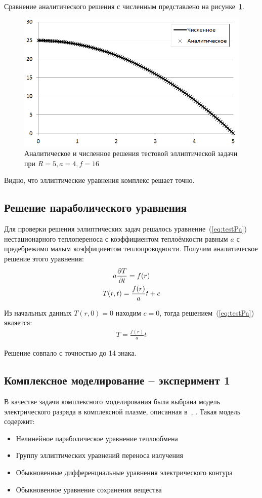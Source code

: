 Сравнение аналитического решения с численным представлено на 
рисунке~\ref{fig:testEl}.

\begin{figure}
    \centering
    \includegraphics[width=.8\linewidth]{img/experiments/Elliptic/elVsAn}
    \caption{Аналитическое и численное решения тестовой эллиптической задачи 
    при $R=5, a=4, f=16$}
    \label{fig:testEl}
\end{figure}

Видно, что эллиптические уравнения комплекс решает точно.

\subsection{Решение параболического уравнения}
Для проверки решения эллиптических задач решалось уравнение~(\ref{eq:testPa}) 
нестационарного теплопереноса с коэффициентом теплоёмкости равным $a$ с 
предебрежимо малым коэффициентом теплопроводности. 
Получим аналитическое решение этого уравнения:
\begin{gather*}
a\frac{\partial T}{\partial t} = f(r)
\label{eq:testPa}\\
T(r, t) = \frac{f(r)}{a}t + c\\
\end{gather*}

Из начальных данных $T(r, 0) = 0$ находим $c = 0$, тогда 
решением~(\ref{eq:testPa}) является:
\begin{gather*}
T = \frac{f(r)}{a}t
\end{gather*}

Решение совпало с точностью до 14 знака.

\subsection{Комплексное моделирование -- эксперимент 1}\label{sec:compSlow1}
В качестве задачи комплексного моделирования была выбрана модель электрического 
разряда в комплексной плазме, описанная в~\cite{gzl,bachpaper}, . Такая модель 
содержит:
\begin{itemize}
    \item Нелинейное параболическое уравнение теплообмена
    \item Группу эллиптических уравнений переноса излучения
    \item Обыкновенные дифференциальные уравнения электрического контура
    \item Обыкновенное уравнение сохранения вещества
\end{itemize}

